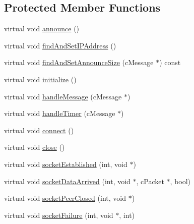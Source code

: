 \subsection*{Protected Member Functions}
\begin{DoxyCompactItemize}
\item 
virtual void \hyperlink{classBTTrackerClientBase_ab069678d1177731f94c52620f91e6f55}{announce} ()
\item 
virtual void \hyperlink{classBTTrackerClientBase_a245a5285af4b921bc4750245b8c73e0d}{find\+And\+Set\+I\+P\+Address} ()
\item 
virtual void \hyperlink{classBTTrackerClientBase_adc7c0ed12a24c892801841a96f663a2a}{find\+And\+Set\+Announce\+Size} (c\+Message $\ast$) const 
\item 
virtual void \hyperlink{classBTTrackerClientBase_a3427a3d40ea862c9e362061e1e65c616}{initialize} ()
\item 
virtual void \hyperlink{classBTTrackerClientBase_a04f42878a2710962bbb88f96706c6dca}{handle\+Message} (c\+Message $\ast$)
\item 
virtual void \hyperlink{classBTTrackerClientBase_aa7f93bb3a652daa74b54b1eedaafc7ad}{handle\+Timer} (c\+Message $\ast$)
\item 
virtual void \hyperlink{classBTTrackerClientBase_a44eed7960a877b2b162180bc5383ef6a}{connect} ()
\item 
virtual void \hyperlink{classBTTrackerClientBase_a7ae7c9871d98d153e0c6755d18a2b9e5}{close} ()
\item 
virtual void \hyperlink{classBTTrackerClientBase_a140fb33f9b56bddc2e60c4270fc6f685}{socket\+Established} (int, void $\ast$)
\item 
virtual void \hyperlink{classBTTrackerClientBase_acccef00f80f12202e4b63b1098af1d75}{socket\+Data\+Arrived} (int, void $\ast$, c\+Packet $\ast$, bool)
\item 
virtual void \hyperlink{classBTTrackerClientBase_ad9b4cdff6c47ef5e12018fb010b608e7}{socket\+Peer\+Closed} (int, void $\ast$)
\item 
virtual void \hyperlink{classBTTrackerClientBase_a2f099a4c762287c598b449e8183f4679}{socket\+Failure} (int, void $\ast$, int)
\end{DoxyCompactItemize}
